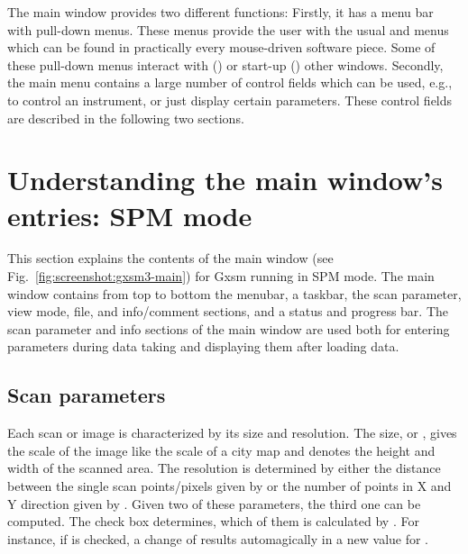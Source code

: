 


The main window provides two different functions:  Firstly, it has a menu bar with pull-down menus.  These menus provide the user with the usual  and  menus which can be found in practically every mouse-driven software piece.  Some of these pull-down menus interact with () or start-up () other windows.  Secondly, the main menu contains a large number of control fields which can be used, e.g., to control an instrument, or just display certain parameters. These control fields are described in the following two sections.


\section{Understanding the main window's entries: SPM mode}
\label{sec:main:spmentries}

This section explains the contents of the main window (see Fig.~\ref{fig:screenshot:gxsm3-main}) for Gxsm running in SPM mode.  The main window contains from top to bottom the menubar, a taskbar, the scan parameter, view mode, file, and info/comment sections, and a status and progress bar. The scan parameter and info sections of the main window are used both for entering parameters during data taking and displaying them after loading data.

\subsection{Scan parameters}

Each scan or image is characterized by its size and resolution. The size, or , gives the scale of the image like the scale of a city map and denotes the height and width of the scanned area. The resolution is determined by either the distance between the single scan points/pixels given by  or the number of points in X and Y direction given by . Given two of these parameters, the third one can be computed. The check box  determines, which of
them is calculated by \Gxsm. For instance, if  is checked, a change of  results automagically in a new value for .

